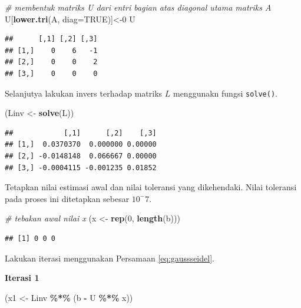\documentclass[
]{book}
\newenvironment{Shaded}{\begin{snugshade}}{\end{snugshade}}
\newcommand{\AttributeTok}[1]{\textcolor[rgb]{0.13,0.29,0.53}{#1}}
\newcommand{\CommentTok}[1]{\textcolor[rgb]{0.56,0.35,0.01}{\textit{#1}}}
\newcommand{\ConstantTok}[1]{\textcolor[rgb]{0.56,0.35,0.01}{#1}}
\newcommand{\DecValTok}[1]{\textcolor[rgb]{0.00,0.00,0.81}{#1}}
\newcommand{\FunctionTok}[1]{\textcolor[rgb]{0.13,0.29,0.53}{\textbf{#1}}}
\newcommand{\NormalTok}[1]{#1}
\newcommand{\OtherTok}[1]{\textcolor[rgb]{0.56,0.35,0.01}{#1}}
\newcommand{\SpecialCharTok}[1]{\textcolor[rgb]{0.81,0.36,0.00}{\textbf{#1}}}
\theoremstyle{definition}
\theoremstyle{definition}
\theoremstyle{definition}
\theoremstyle{definition}
\theoremstyle{remark}
\begin{document}
\begin{Shaded}
\begin{Highlighting}[]
\CommentTok{\# membentuk matriks U dari entri bagian atas diagonal utama matriks A}
\NormalTok{U[}\FunctionTok{lower.tri}\NormalTok{(A, }\AttributeTok{diag=}\ConstantTok{TRUE}\NormalTok{)]}\OtherTok{\textless{}{-}}\DecValTok{0}
\NormalTok{U}
\end{Highlighting}
\end{Shaded}

\begin{verbatim}
##      [,1] [,2] [,3]
## [1,]    0    6   -1
## [2,]    0    0    2
## [3,]    0    0    0
\end{verbatim}

Selanjutya lakukan invers terhadap matriks \(L\) menggunakn fungsi \texttt{solve()}.

\begin{Shaded}
\begin{Highlighting}[]
\NormalTok{(Linv }\OtherTok{\textless{}{-}} \FunctionTok{solve}\NormalTok{(L))}
\end{Highlighting}
\end{Shaded}

\begin{verbatim}
##            [,1]      [,2]    [,3]
## [1,]  0.0370370  0.000000 0.00000
## [2,] -0.0148148  0.066667 0.00000
## [3,] -0.0004115 -0.001235 0.01852
\end{verbatim}

Tetapkan nilai estimasi awal dan nilai toleransi yang dikehendaki. Nilai toleransi pada proses ini ditetapkan sebesar \(10^-7\).

\begin{Shaded}
\begin{Highlighting}[]
\CommentTok{\# tebakan awal nilai x}
\NormalTok{(x }\OtherTok{\textless{}{-}} \FunctionTok{rep}\NormalTok{(}\DecValTok{0}\NormalTok{, }\FunctionTok{length}\NormalTok{(b)))}
\end{Highlighting}
\end{Shaded}

\begin{verbatim}
## [1] 0 0 0
\end{verbatim}

Lakukan iterasi menggunakan Persamaan \eqref{eq:gaussseidel}.

\textbf{Iterasi 1}

\begin{Shaded}
\begin{Highlighting}[]
\NormalTok{(x1 }\OtherTok{\textless{}{-}}\NormalTok{ Linv }\SpecialCharTok{\%*\%}\NormalTok{ (b }\SpecialCharTok{{-}}\NormalTok{ U }\SpecialCharTok{\%*\%}\NormalTok{ x))}
\end{Highlighting}
\end{Shaded}
\end{document}
